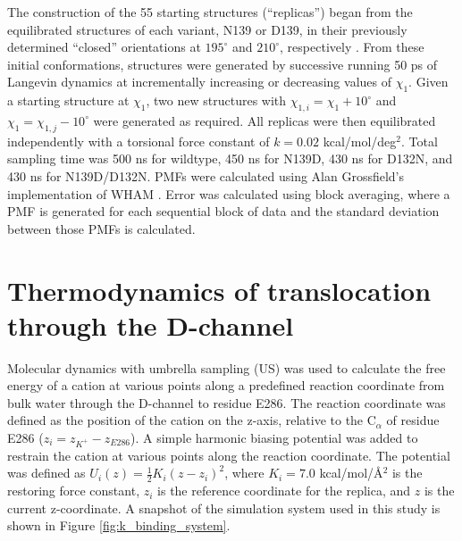 The construction of the 55 starting structures (``replicas'') began from the equilibrated structures of each variant, N139 or D139, in their previously determined ``closed'' orientations at $195^\circ$ and $210^\circ$, respectively \cite{Henry:2009p4543}. From these initial conformations, structures were generated by successive running 50 ps of Langevin dynamics at incrementally increasing or decreasing values of $\chi_1$. Given a starting structure at $\chi_1$, two new structures with $\chi_{1,i} = \chi_1 + 10^{\circ}$ and $\chi_1 = \chi_{1,j} - 10^{\circ}$ were generated as required. All replicas were then equilibrated independently with a torsional force constant of $k = 0.02$ kcal/mol/deg$^2$. Total sampling time was 500 ns for wildtype, 450 ns for N139D, 430 ns for D132N, and 430 ns for N139D/D132N. PMFs were calculated using Alan Grossfield’s implementation of WHAM \cite{Kumar:1995p5435}. Error was calculated using block averaging, where a PMF is generated for each sequential block of data and the standard deviation between those PMFs is calculated.

% 

\section{Thermodynamics of  translocation through the D-channel}

Molecular dynamics with umbrella sampling (US) was used to calculate the free energy of a  cation at various points along a predefined reaction coordinate from bulk water through the D-channel to residue E286. The reaction coordinate was defined as the position of the cation on the z-axis, relative to the C$_{\alpha}$ of residue E286 ($z_i = z_{K^+}-z_{E286}$). A simple harmonic biasing potential was added to restrain the cation at various points along the reaction coordinate. The potential was defined as $U_i(z) = \frac{1}{2}K_{i}(z-z_{i})^2$, where $K_i = 7.0$ kcal/mol/Å$^2$ is the restoring force constant, $z_{i}$ is the reference coordinate for the replica, and $z$ is the current z-coordinate. A snapshot of the simulation system used in this study is shown in Figure \ref{fig:k_binding_system}.

